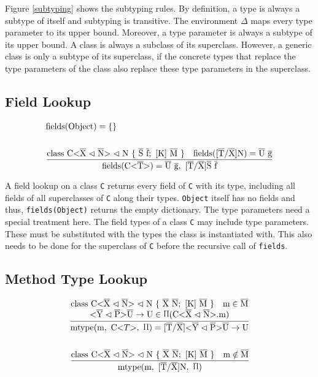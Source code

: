 Figure \ref{subtyping} shows the subtyping rules. By definition, a type is always a subtype of itself and subtyping is transitive. The environment $\Delta$ maps every type parameter to its upper bound. Moreover, a type parameter is always a subtype of its upper bound.
A class is always a subclass of its superclass. However, a generic class is only a subtype of its superclass, if the concrete types that replace the type parameters of the class also replace these type parameters in the superclass.

\subsection{Field Lookup}

\begin{align*}
    &\text{fields}(\text{Object}) = \{\}\\
    \\
    &\frac{\class{S}{f} \quad \text{fields}(\tsxsn{T}{X}{N}) = \ot{U} \ \ot{g} }{\text{fields}(\nvt{C}{T}) = \ot{U} \ \ot{g}, \ \tsxsns{T}{X}{S} \ \ot{f}}\\
\end{align*}

A field lookup on a class \verb|C| returns every field of \verb|C| with its type, including all fields of all superclasses of \verb|C| along their types. \verb|Object| itself has no fields and thus, \verb|fields(Object)| returns the empty dictionary.
The type parameters need a special treatment here. The field types of a class \verb|C| may include type parameters. These must be substituted with the types the class is instantiated with. This also needs to be done for the superclass of \verb|C| before the recursive call of \verb|fields|.

\subsection{Method Type Lookup}

\begin{align*}
    \frac{
        \begin{matrix}
            \class{X}{N} \quad \text{m} \in \ot{M} \\
            \yp \oto{\text{U}} \in \sprod{.7} (\cm)
        \end{matrix}
    }{\mtypeC{\nvtt{C}{T}} = \tsxsn{T}{X}{} \yp \oto{\text{U}}}
    \\
    \\
    \frac{\class{X}{N} \quad \text{m} \notin \ot{M}}{\mtypeC{\tsxsn{T}{X}{N}}}
\end{align*}


